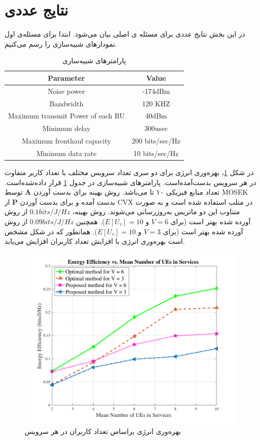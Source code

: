 \section{نتایج عددی}\label{simul}
در این بخش نتایج عددی برای مسئله ی اصلی بیان می‌شود.
ابتدا برای مسئله‌ی اول نمودارهای شبیه‌سازی را رسم می‌کنیم.
\begin{table}
	\caption {پارامترهای شبیه‌سازی} \label{table:1a}
	\begin{latin}
	\begin{center}
		\begin{tabular}{||c c ||}
			\hline
			Parameter & Value \\ [0.5ex]
			\hline\hline
			Noise power & -174dBm\\
			\hline
			Bandwidth & 120 KHZ \\
			\hline
			Maximum transmit Power of each RU & 40dBm \\
			\hline
			Minimum delay &  300usec \\
			\hline
			Maximum fronthaul capacity  & 200 bits/sec/Hz \\
			\hline
			Minimum data rate &  10 bits/sec/Hz \\ [1ex]
			\hline
		\end{tabular}
	\end{center}
	\end{latin}
\end{table}
در شکل \ref{fig:f1a}، بهره‌وری انرژی برای دو سری تعداد سرویس مختلف با تعداد کاربر متفاوت در هر سرویس بدست‌آمده‌است.
پارامترهای شبیه‌سازی در جدول \ref{table:1a} قرار داده‌شده‌است. تعداد منابع فیزیکی ۱۰ تا می‌باشد.
روش بهینه برای بدست آوردن $\boldsymbol{A}$ توسط MOSEK بدست آمده و برای بدست آوردن $\boldsymbol{P}$ از CVX در متلب استفاده شده است و به صورت متناوب این دو ماتریس به‌روزرسانی می‌شوند. 
روش بهینه،  
$0.1bits/J/Hz$ 
از روش آورده شده بهتر است (برای  $V = 6$ و $E[U_v] = 10$).
همچنین 
$0.09bits/J/Hz$
از روش آورده شده بهتر است (برای  $V = 3$ و $E[U_v] = 10$).
همانطور که در شکل مشخص است بهره‌وری انرژی با افزایش تعداد کاربران افزایش می‌یابد.
\begin{figure}%
	\centering
	\includegraphics[width=\linewidth]{./fig/fig1_last}
	\caption{بهره‌وری انرژی براساس تعداد کاربران در هر سرویس}
	\label{fig:f1a}
\end{figure}
